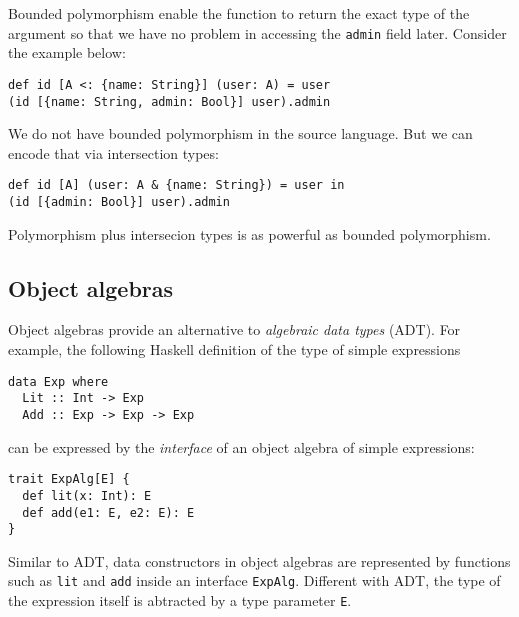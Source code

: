 Bounded polymorphism enable the function to return the exact type of the
argument so that we have no problem in accessing the \texttt{admin} field later.
Consider the example below:
\begin{verbatim}
def id [A <: {name: String}] (user: A) = user
(id [{name: String, admin: Bool}] user).admin
\end{verbatim}

We do not have bounded polymorphism in the source language. But we can encode
that via intersection types:
\begin{verbatim}
def id [A] (user: A & {name: String}) = user in
(id [{admin: Bool}] user).admin
\end{verbatim}

Polymorphism plus intersecion types is as powerful as bounded polymorphism.

\cite{pierce1997intersection}




\subsection{Object algebras}

Object algebras provide an alternative to \emph{algebraic data types}
(ADT).
 For example, the
following Haskell definition of the type of simple expressions
\begin{verbatim}
data Exp where
  Lit :: Int -> Exp
  Add :: Exp -> Exp -> Exp
\end{verbatim}
can be expressed by the \emph{interface} of an object algebra of
simple expressions:
\begin{verbatim}
trait ExpAlg[E] {
  def lit(x: Int): E
  def add(e1: E, e2: E): E
}
\end{verbatim}
Similar to ADT, data constructors in object algebras are represented by functions such as
\lstinline{lit} and \lstinline{add} inside an interface \lstinline{ExpAlg}.
Different with ADT, the type of the expression itself is abtracted by a type
parameter \lstinline{E}.

